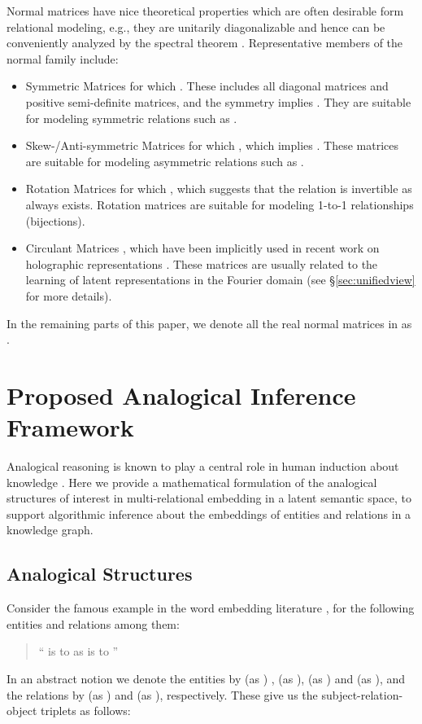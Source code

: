 \documentclass{article}
\begin{document}
Normal matrices have nice theoretical properties which are often desirable form relational modeling, e.g., they are unitarily diagonalizable and hence can be conveniently analyzed by the spectral theorem \cite{dunford1971linear}.
Representative members of the normal family include:
\begin{itemize}
    \item Symmetric Matrices for which .  These includes all diagonal matrices and positive semi-definite matrices,
        and the symmetry implies .
        They are suitable for modeling symmetric relations such as .
    \item Skew-/Anti-symmetric Matrices for which , which implies .
        These matrices are suitable for modeling asymmetric relations
        such as .
    \item Rotation Matrices for which ,
        which suggests that the relation  is invertible as  always exists.
        Rotation matrices are suitable for modeling 1-to-1 relationships (bijections).
    \item Circulant Matrices \cite{gray2006toeplitz},
        which have been implicitly used in recent work on holographic representations \cite{DBLP:conf/aaai/NickelRP16}.
        These matrices are usually related to the learning of latent representations in the Fourier domain
        (see \S \ref{sec:unifiedview} for more details).
\end{itemize}

In the remaining parts of this paper, we denote all the real normal matrices in  as .



 \section{Proposed Analogical Inference Framework}
\label{sec:analogies}
Analogical reasoning is known to play a central role in human induction about knowledge \cite{gentner1983structure, minsky1988society, holyoak1996mental, hofstadter2001analogy}. Here we provide a mathematical formulation of the analogical structures of interest in multi-relational embedding in a latent semantic space, to support algorithmic inference about the embeddings of entities and relations in a knowledge graph. 


\subsection{Analogical Structures}
Consider the famous example in the word embedding literature \cite{mikolov2013distributed, pennington2014glove},
for the following entities and relations among them: 
\begin{quote}
`` is to  as  is to ''
\end{quote}
In an abstract notion we denote the entities by  (as ) ,  (as ),  (as ) and  (as ), and the relations by   (as )  and  (as ), respectively. These give us the subject-relation-object triplets as follows:
\end{document}
